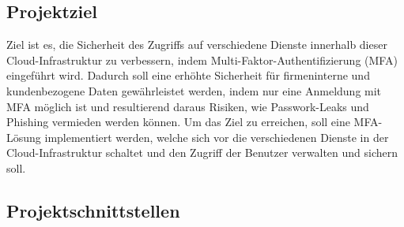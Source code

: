 \subsection{Projektziel} 
\label{sec:Projektziel}
Ziel ist es, die Sicherheit des Zugriffs auf verschiedene Dienste innerhalb dieser Cloud-Infrastruktur zu verbessern, indem 
Multi-Faktor-Authentifizierung (\acs{MFA}) eingeführt wird. Dadurch soll eine erhöhte Sicherheit für firmeninterne und kundenbezogene 
Daten gewährleistet werden, indem nur eine Anmeldung mit \acs{MFA} möglich ist und resultierend daraus Risiken, wie Passwork-Leaks 
und Phishing vermieden werden können.
Um das Ziel zu erreichen, soll eine MFA-Lösung implementiert werden, welche sich vor die verschiedenen Dienste in der 
Cloud-Infrastruktur schaltet und den Zugriff der Benutzer verwalten und sichern soll.

\subsection{Projektschnittstellen} 
\label{sec:Projektschnittstellen}

